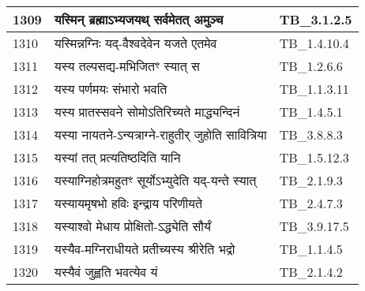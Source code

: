 \documentclass[17pt]{extarticle}
\begin{document}
\begin{longtable}{||p{0.4in}||p{4.9in}||p{0.9in}||}
    \hline
        
    1309 & यस्मिन् ब्रह्माऽभ्यजयथ् सर्वमेतत् अमुञ्च & TB\_3.1.2.5       \\
    
    \hline
        
    1310 & यस्मिन्नग्निः यद्{-}वैश्वदेवेन यजते एतमेव & TB\_1.4.10.4       \\
    
    \hline
        
    1311 & यस्य तल्पसद्य{-}मभिजितꣳ स्यात् स & TB\_1.2.6.6       \\
    
    \hline
        
    1312 & यस्य पर्णमयः संभारो भवति & TB\_1.1.3.11       \\
    
    \hline
        
    1313 & यस्य प्रातस्सवने सोमोऽतिरिच्यते माद्ध्यन्दिनं & TB\_1.4.5.1       \\
    
    \hline
        
    1314 & यस्या नायतने{-}ऽन्यत्राग्ने{-}राहुतीर् जुहोति सावित्रिया & TB\_3.8.8.3       \\
    
    \hline
        
    1315 & यस्यां तत् प्रत्यतिष्ठदिति यानि & TB\_1.5.12.3       \\
    
    \hline
        
    1316 & यस्याग्निहोत्रमहुतꣳ सूर्योऽभ्युदेति यद्{-}यन्ते स्यात् & TB\_2.1.9.3       \\
    
    \hline
        
    1317 & यस्यायमृषभो हविः इन्द्राय परिणीयते & TB\_2.4.7.3       \\
    
    \hline
        
    1318 & यस्याश्वो मेधाय प्रोक्षितो{-}ऽद्ध्येति सौर्यं & TB\_3.9.17.5       \\
    
    \hline
        
    1319 & यस्यैव{-}मग्निराधीयते प्रतीच्यस्य श्रीरेति भद्रो & TB\_1.1.4.5       \\
    
    \hline
        
    1320 & यस्यैवं जुह्वति भवत्येव यं & TB\_2.1.4.2       \\
    

\end{longtable}
\end{document}
